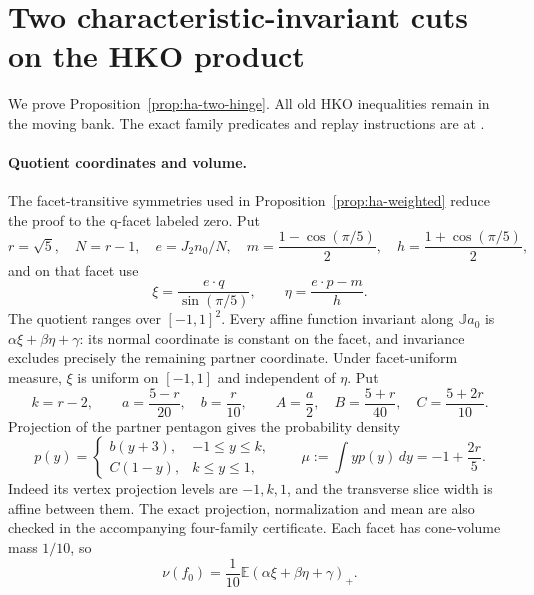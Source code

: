 \section{Two characteristic-invariant cuts on the HKO product}
\label{sec:ha-two-hinge-proof}

We prove Proposition~\ref{prop:ha-two-hinge}. All old HKO inequalities
remain in the moving bank. The exact family predicates and replay
instructions are at .

\paragraph{Quotient coordinates and volume.}
The facet-transitive symmetries used in Proposition~\ref{prop:ha-weighted}
reduce the proof to the q-facet labeled zero. Put
\[
 r=\sqrt5,\quad N=r-1,\quad e=J_2n_0/N,\quad
 m=\frac{1-\cos(\pi/5)}2,\quad h=\frac{1+\cos(\pi/5)}2,
\]
and on that facet use
\[
 \xi=\frac{e\cdot q}{\sin(\pi/5)},\qquad
 \eta=\frac{e\cdot p-m}{h}.
\]
The quotient ranges over $[-1,1]^2$. Every affine function invariant along
$\mathbb{J}a_0$ is $\alpha\xi+\beta\eta+\gamma$: its normal coordinate is constant
on the facet, and invariance excludes precisely the remaining partner
coordinate. Under facet-uniform measure, $\xi$ is uniform on $[-1,1]$ and
independent of $\eta$. Put
\[
 k=r-2,\qquad a=\frac{5-r}{20},\quad b=\frac r{10},\qquad
 A=\frac a2,\quad B=\frac{5+r}{40},\quad C=\frac{5+2r}{10}.
\]
Projection of the partner pentagon gives the probability density
\begin{equation}\label{eq:ha-quotient-density}
 p(y)=\begin{cases}b(y+3),&-1\leq y\leq k,\\
                   C(1-y),&k\leq y\leq1,
       \end{cases}
 \qquad \mu:=\int yp(y)\,dy=-1+\frac{2r}{5}.
\end{equation}
Indeed its vertex projection levels are $-1,k,1$, and the transverse slice
width is affine between them. The exact projection, normalization and mean
are also checked in the accompanying four-family certificate. Each facet
has cone-volume mass $1/10$, so
\begin{equation}\label{eq:ha-quotient-volume}
 \nu(f_0)=\frac1{10}\mathbb E
                (\alpha\xi+\beta\eta+\gamma)_+.
\end{equation}

